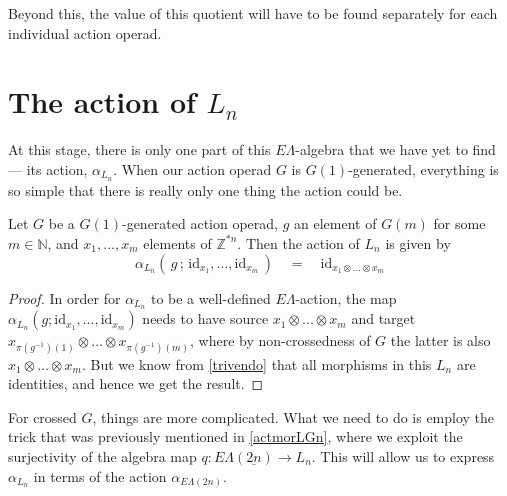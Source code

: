 \documentclass{amsbook} %
\newcommand{\ELnn}{E\Lambda(\underline{2n})}
\numberwithin{section}{chapter}
\begin{document}
Beyond this, the value of this quotient will have to be found separately for each individual action operad. 

\section{The action of \texorpdfstring{$L_n$}{L_n}}

At this stage, there is only one part of this $E\Lambda$-algebra that we have yet to find --- its action, $\alpha_{L_n}$. When our action operad $G$ is $G(1)$-generated, everything is so simple that there is really only one thing the action could be.

\begin{lem} \label{G1act} Let $G$ be a $G(1)$-generated action operad, $g$ an element of $G(m)$ for some $m \in \mathbb{N}$, and $x_1, ..., x_m$ elements of $\mathbb{Z}^{\ast n}$. Then the action of $L_n$ is given by
\[ \alpha_{L_n}( \, g \, ; \, \mathrm{id}_{x_1}, ..., \mathrm{id}_{x_m} \, ) \quad = \quad \mathrm{id}_{x_1 \otimes ... \otimes x_m} \]
\end{lem}
\begin{proof}
In order for $\alpha_{L_n}$ to be a well-defined $E\Lambda$-action, the map $\alpha_{L_n}(g; \mathrm{id}_{x_1}, ..., \mathrm{id}_{x_m})$ needs to have source $x_1 \otimes ... \otimes x_m$ and target $x_{\pi(g^{-1})(1)} \otimes ... \otimes x_{\pi(g^{-1})(m)}$, where by non-crossedness of $G$ the latter is also $x_1 \otimes ... \otimes x_m$. But we know from \cref{trivendo} that all morphisms in this $L_n$ are identities, and hence we get the result.
\end{proof}

For crossed $G$, things are more complicated. What we need to do is employ the trick that was previously mentioned in \cref{actmorLGn}, where we exploit the surjectivity of the algebra map $q: \ELnn \to L_n$. This will allow us to express $\alpha_{L_n}$ in terms of the action $\alpha_{\ELnn}$. 
\end{document}
